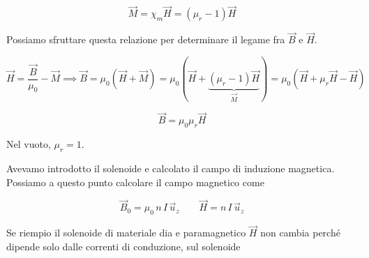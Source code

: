 \[
	\boxed{\vec{M} =\chi_m\vec{H} =(\mu_r -1)\vec{H}}
\]

Possiamo sfruttare questa relazione per determinare il legame fra $\vec{B}$ e $ \vec{H}  $.

\[
	\vec{H} =\frac{\vec{B}}{\mu_0}-\vec{M} \implies \vec{B} =\mu_0 (\vec{H} +\vec{M} )=\mu_0 (\vec{H} + \underbrace{(\mu_r -1)\vec{H}}_{\vec{M}}  ) = \mu_0 (\vec{H} +\mu_r \vec{H} -\vec{H})
\]

\[
	\boxed{\vec{B} =\mu_0 \mu_r \vec{H}}
\]

Nel vuoto, $ \mu_r =1 $.

Avevamo introdotto il solenoide e calcolato il campo di induzione magnetica. Possiamo a questo punto calcolare il campo magnetico come

\[
	\vec{B}_0 = \mu_0 \,n\,I\,\vec{u}_z \qquad \vec{H} =n\,I\,\vec{u}_z
\]

Se riempio il solenoide di materiale dia e paramagnetico $\vec{H}$ non cambia perché dipende solo dalle correnti di conduzione, sul solenoide

